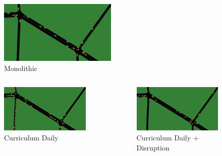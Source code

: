\documentclass[dvipsnames]{beamer}
\begin{document}
\begin{frame}
  \begin{figure}
    \centering
    \includegraphics[width=0.5\textwidth]{figures/demo.clr.mon.png}
    \caption{Monolithic}
  \end{figure}
  \begin{columns}
    \begin{column}{0.5\textwidth}
      \begin{figure}
        \centering
        \includegraphics[width=1.0\textwidth]{figures/demo.clr.cd.png}
        \caption{Curriculum Daily}
      \end{figure}
    \end{column}
    \begin{column}{0.5\textwidth}
      \begin{figure}
        \centering
        \includegraphics[width=1.0\textwidth]{figures/demo.clr.cdd.png}
        \caption{Curriculum Daily + Disruption}
      \end{figure}
    \end{column}
  \end{columns}
\end{frame}
\end{document}
